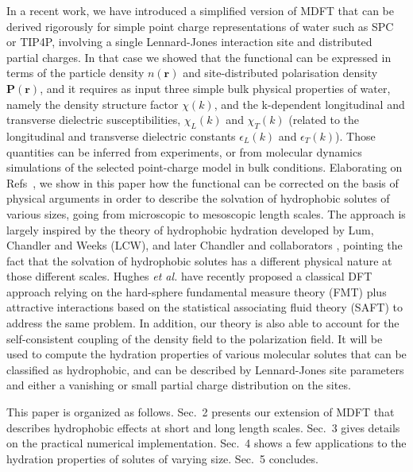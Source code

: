 \documentclass[aip,jcp,preprint]{revtex4-1}
\newcommand{\rr}{\mathbf{r}}
\newcommand{\PP}{\mathbf{P}}
\begin{document}
In a recent work\cite{jeanmairet13}, we have introduced a simplified version of MDFT that can be derived rigorously for simple point charge representations of water such as SPC or TIP4P, involving a  single Lennard-Jones interaction site and distributed partial charges. In that case we showed that the functional can be expressed in terms of the particle density $n(\rr)$ and site-distributed polarisation density $\PP(\rr)$, and it requires  as input three simple bulk physical properties of water, namely the density structure factor $\chi(k)$, and the k-dependent longitudinal and transverse dielectric susceptibilities, $\chi_L(k)$ and $\chi_T(k)$ (related to the longitudinal and transverse dielectric constants $\epsilon_L(k)$ and $\epsilon_T(k)$\cite{raineri92,raineri93,bopp98}). Those quantities can be inferred from experiments, or from molecular dynamics simulations of the selected point-charge model in bulk conditions\cite{bopp96,bopp98}. Elaborating on Refs~, we  show in this paper how the  functional can be corrected on the basis of physical arguments  in order to describe the solvation of hydrophobic solutes of various sizes, going from microscopic to mesoscopic length scales. The approach is largely inspired by the theory of hydrophobic hydration developed by Lum, Chandler and Weeks (LCW)\cite{lum99}, and later Chandler and collaborators
\cite{tenwolde01,tenwolde02,huang02,varilly11,chandler-varilly11}, pointing the fact that the solvation of hydrophobic solutes has a different physical nature at those different  scales.  Hughes {\em et al.} have recently proposed a classical DFT approach relying on the hard-sphere fundamental measure theory (FMT) plus attractive interactions based on the
statistical associating fluid theory  (SAFT)  to address the same problem\cite{roundy13}. In addition,  our theory is also able to account for the self-consistent coupling of the density field to the  polarization field. It will be used to compute the hydration properties of various molecular solutes that can be classified as hydrophobic, and can be described by  Lennard-Jones site parameters and  either a vanishing or small partial charge distribution on the sites.

This paper is organized as follows. Sec.~2 presents our extension of MDFT that describes  hydrophobic effects at short and long length scales. Sec.~3  gives details on the practical numerical implementation. Sec.~4 shows a few applications to the hydration properties of solutes of varying size. Sec.~5 concludes.
\end{document}
